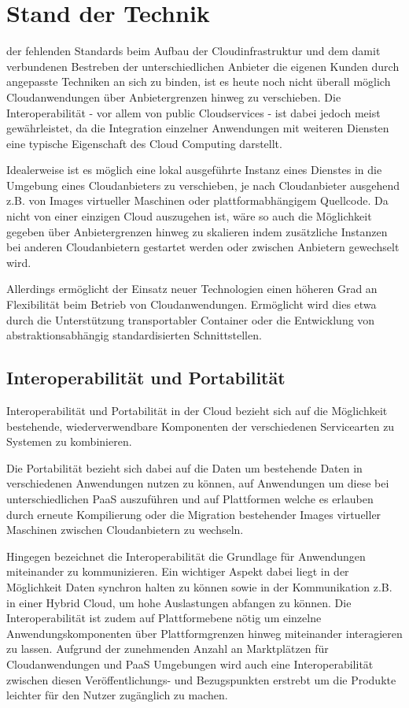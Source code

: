 \section{Stand der Technik}
\label{sec_facts}

 der fehlenden Standards beim Aufbau der Cloudinfrastruktur und dem damit verbundenen Bestreben der unterschiedlichen Anbieter die eigenen Kunden durch angepasste Techniken an sich zu binden, ist es heute noch nicht überall möglich Cloudanwendungen über Anbietergrenzen hinweg zu verschieben. Die Interoperabilität - vor allem von public Cloudservices - ist dabei jedoch meist gewährleistet, da die Integration einzelner Anwendungen mit weiteren Diensten eine typische Eigenschaft des Cloud Computing darstellt.

Idealerweise ist es möglich eine lokal ausgeführte Instanz eines Dienstes in die Umgebung eines Cloudanbieters zu verschieben, je nach Cloudanbieter ausgehend z.B. von Images virtueller Maschinen oder plattformabhängigem Quellcode. Da nicht von einer einzigen Cloud auszugehen ist, wäre so auch die Möglichkeit gegeben über Anbietergrenzen hinweg zu skalieren indem zusätzliche Instanzen bei anderen Cloudanbietern gestartet werden oder zwischen Anbietern gewechselt wird.

Allerdings ermöglicht der Einsatz neuer Technologien einen höheren Grad an Flexibilität beim Betrieb von Cloudanwendungen. Ermöglicht wird dies etwa durch die Unterstützung transportabler Container oder die Entwicklung von abstraktionsabhängig standardisierten Schnittstellen.

\subsection{Interoperabilität und Portabilität}
Interoperabilität und Portabilität in der Cloud bezieht sich auf die Möglichkeit bestehende, wiederverwendbare Komponenten der verschiedenen Servicearten zu Systemen zu kombinieren.

Die Portabilität bezieht sich dabei auf die Daten um bestehende Daten in verschiedenen Anwendungen nutzen zu können, auf Anwendungen um diese bei unterschiedlichen PaaS auszuführen und auf Plattformen welche es erlauben durch erneute Kompilierung oder die Migration bestehender Images virtueller Maschinen zwischen Cloudanbietern zu wechseln.

Hingegen bezeichnet die Interoperabilität die Grundlage für Anwendungen miteinander zu kommunizieren. Ein wichtiger Aspekt dabei liegt in der Möglichkeit Daten synchron halten zu können sowie in der Kommunikation z.B. in einer Hybrid Cloud, um hohe Auslastungen abfangen zu können.
Die Interoperabilität ist zudem auf Plattformebene nötig um einzelne Anwendungskomponenten über Plattformgrenzen hinweg miteinander interagieren zu lassen.
Aufgrund der zunehmenden Anzahl an Marktplätzen für Cloudanwendungen und PaaS Umgebungen wird auch eine Interoperabilität zwischen diesen Veröffentlichungs- und Bezugspunkten erstrebt um die Produkte leichter für den Nutzer zugänglich zu machen.

